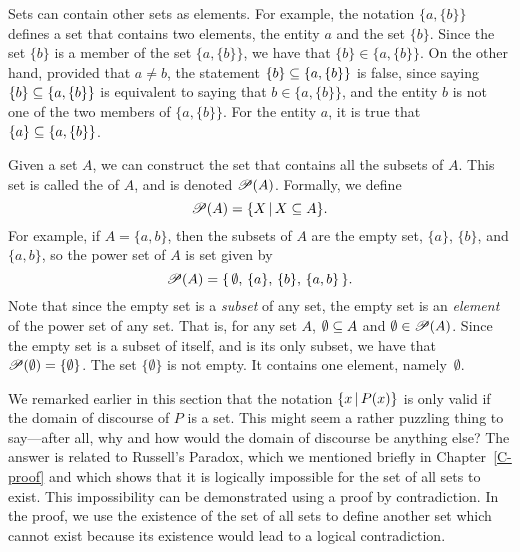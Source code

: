 Sets can contain other sets as elements.  For example, the notation $\{a,\{b\}\}$
defines a set that contains two elements, the entity $a$ and the set $\{b\}$.
Since the set $\{b\}$ is a 
member of the set $\{a,\{b\}\}$, we have that $\{b\}\in\{a,\{b\}\}$.
On the other hand, provided that $a\not=b$, the statement $\{b\}\subseteq\{a,\{b\}\}$
is false, since saying $\{b\}\subseteq\{a,\{b\}\}$ is equivalent to saying that
$b\in\{a,\{b\}\}$, and the entity $b$ is not one of the two members
of $\{a,\{b\}\}$.   For the entity $a$, it is true that $\{a\}\subseteq\{a,\{b\}\}$.

Given a set $A$, we can construct the set that contains all the
subsets of $A$.  This set is called the  of $A$, and
is denoted ${\mathscr P}(A)$.  Formally, we define
\[{\mathscr P}(A)=\{X\,|\, X\subseteq A\}.\]
For example, if $A=\{a,b\}$, then the subsets of $A$ are the empty set,
$\{a\}$, $\{b\}$, and $\{a,b\}$, so the power set of $A$ is set given by
\[{\mathscr P}(A) = \{\,\emptyset,\,\{a\},\,\{b\},\,\{a,b\}\,\}.\]
Note that since the empty set is a \emph{subset} of any set, the empty
set is an \emph{element} of the power set of any set.  That is, for
any set $A$, $\emptyset\subseteq A$ and $\emptyset\in{\mathscr P}(A)$.  Since the
empty set is a subset of itself, and is its only subset, we have
that ${\mathscr P}(\emptyset) = \{\emptyset\}$.  The set $\{\emptyset\}$ is not
empty.  It contains one element, namely~$\emptyset$.


\medbreak

We remarked earlier in this section that the notation $\{x \,|\, P(x)\}$
is only valid if the domain of discourse of $P$ is a set.  This might
seem a rather puzzling thing to say---after all, why and how would
the domain of discourse be anything else?  The answer is related to
Russell's Paradox, which we mentioned briefly in Chapter~\ref{C-proof}
and which 
shows that it is logically impossible for the
set of all sets to exist. This impossibility can be demonstrated using a proof by 
contradiction.  In the proof, we use the existence of the set of
all sets to define another set which cannot exist because
its existence would lead to a logical contradiction.

